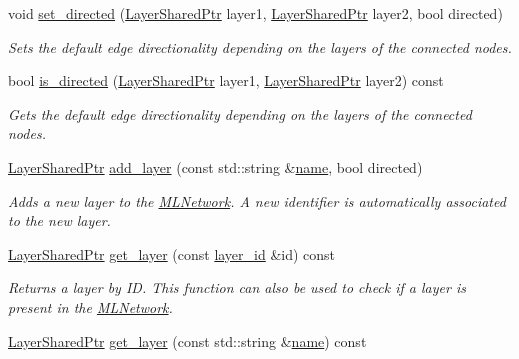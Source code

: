 \begin{DoxyCompactItemize}
void \hyperlink{classmlnet_1_1_m_l_network_a17c4df943b713597c191bdad8a844fb5}{set\+\_\+directed} (\hyperlink{namespacemlnet_a10c007fb811c55339dd5b9d32bb0505d}{Layer\+Shared\+Ptr} layer1, \hyperlink{namespacemlnet_a10c007fb811c55339dd5b9d32bb0505d}{Layer\+Shared\+Ptr} layer2, bool directed)
\begin{DoxyCompactList}\small\item\em Sets the default edge directionality depending on the layers of the connected nodes. \end{DoxyCompactList}\item 
bool \hyperlink{classmlnet_1_1_m_l_network_ac7e339d6c2d18acd1adef418346a8888}{is\+\_\+directed} (\hyperlink{namespacemlnet_a10c007fb811c55339dd5b9d32bb0505d}{Layer\+Shared\+Ptr} layer1, \hyperlink{namespacemlnet_a10c007fb811c55339dd5b9d32bb0505d}{Layer\+Shared\+Ptr} layer2) const 
\begin{DoxyCompactList}\small\item\em Gets the default edge directionality depending on the layers of the connected nodes. \end{DoxyCompactList}\item 
\hyperlink{namespacemlnet_a10c007fb811c55339dd5b9d32bb0505d}{Layer\+Shared\+Ptr} \hyperlink{classmlnet_1_1_m_l_network_a5ee8b4d3dbce2b4f581c2b3328ec3968}{add\+\_\+layer} (const std\+::string \&\hyperlink{classmlnet_1_1_m_l_network_aa2e1496321423e15a8e97e0daed30ca7}{name}, bool directed)
\begin{DoxyCompactList}\small\item\em Adds a new layer to the \hyperlink{classmlnet_1_1_m_l_network}{M\+L\+Network}. A new identifier is automatically associated to the new layer. \end{DoxyCompactList}\item 
\hyperlink{namespacemlnet_a10c007fb811c55339dd5b9d32bb0505d}{Layer\+Shared\+Ptr} \hyperlink{classmlnet_1_1_m_l_network_a1bfb2989c14ac0dbfa836de5c3ae94cf}{get\+\_\+layer} (const \hyperlink{namespacemlnet_a84ad9c6056f0eb7d129995351f9b13fb}{layer\+\_\+id} \&id) const 
\begin{DoxyCompactList}\small\item\em Returns a layer by I\+D. This function can also be used to check if a layer is present in the \hyperlink{classmlnet_1_1_m_l_network}{M\+L\+Network}. \end{DoxyCompactList}\item 
\hyperlink{namespacemlnet_a10c007fb811c55339dd5b9d32bb0505d}{Layer\+Shared\+Ptr} \hyperlink{classmlnet_1_1_m_l_network_a788bb8d8f559e76deb6c14b58b15bb82}{get\+\_\+layer} (const std\+::string \&\hyperlink{classmlnet_1_1_m_l_network_aa2e1496321423e15a8e97e0daed30ca7}{name}) const 

\end{DoxyCompactItemize}
